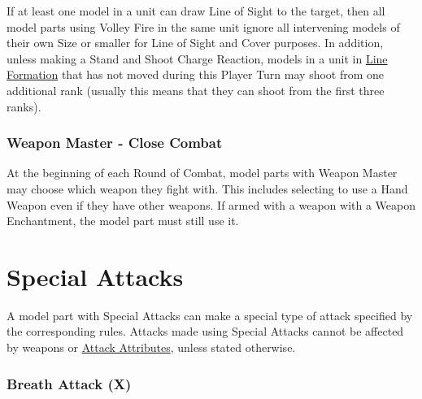 If at least one model in a unit can draw Line of Sight to the target, then all model parts using Volley Fire in the same unit ignore all intervening models of their own Size or smaller for Line of Sight and Cover purposes. In addition, unless making a Stand and Shoot Charge Reaction, models in a unit in \hyperref[line_formation]{Line Formation} that has not moved during this Player Turn may shoot from one additional rank (usually this means that they can shoot from the first three ranks).

\subsubsection{Weapon Master - Close Combat}
\label{weapon_master}

At the beginning of each Round of Combat, model parts with Weapon Master may choose which weapon they fight with. This includes selecting to use a Hand Weapon even if they have other weapons. If armed with a weapon with a Weapon Enchantment, the model part must still use it.

\section{Special Attacks}
\label{special_attacks}

A model part with Special Attacks can make a special type of attack specified by the corresponding rules. Attacks made using Special Attacks cannot be affected by weapons or \hyperref[attack_attributes]{Attack Attributes}, unless stated otherwise.

\subsubsection{Breath Attack (X)}
\label{breath_attack}

